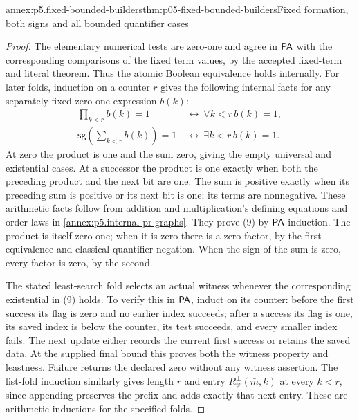 \begin{annexitem}{annex:p5.fixed-bounded-builders}{thm:p05-fixed-bounded-builders}{Fixed formation, both signs and all bounded quantifier cases}
\begin{proof}
The elementary numerical tests are zero-one and agree in \(\mathsf{PA}\)
with the corresponding comparisons of the fixed term values, by the
accepted fixed-term and literal theorem. Thus the atomic Boolean
equivalence holds internally. For later folds, induction on a counter
\(r\) gives the following internal facts for any separately fixed
zero-one expression \(b(k)\):
\[
\begin{aligned}
 \prod_{k<r}b(k)=1&\ \leftrightarrow\ \forall k<r\,b(k)=1,\\
 \mathsf{sg}\left(\sum_{k<r}b(k)\right)=1
                      &\ \leftrightarrow\ \exists k<r\,b(k)=1.
\end{aligned}
\tag{9}
\]
At zero the product is one and the sum zero, giving the empty universal
and existential cases. At a successor the product is one exactly when
both the preceding product and the next bit are one. The sum is positive
exactly when its preceding sum is positive or its next bit is one;
its terms are nonnegative. These arithmetic facts follow from addition
and multiplication's defining equations and order laws in
\cref{annex:p5.internal-pr-graphs}. They prove (9) by \(\mathsf{PA}\)
induction. The product is itself zero-one; when it is zero there is a
zero factor, by the first equivalence and classical quantifier negation.
When the sign of the sum is zero, every factor is zero, by the second.

The stated least-search fold selects an actual witness whenever the
corresponding existential in (9) holds. To verify this in \(\mathsf{PA}\),
induct on its counter: before the first success its flag is zero and
no earlier index succeeds; after a success its flag is one, its saved
index is below the counter, its test succeeds, and every smaller index
fails. The next update either records the current first success or
retains the saved data. At the supplied final bound this proves both
the witness property and leastness. Failure returns the declared zero
without any witness assertion. The list-fold induction similarly gives
length \(r\) and entry \(R_\psi^\pm(\bar m,k)\) at every \(k<r\),
since appending preserves the prefix and adds exactly that next entry.
These are arithmetic inductions for the specified folds.


\end{proof}
\end{annexitem}

